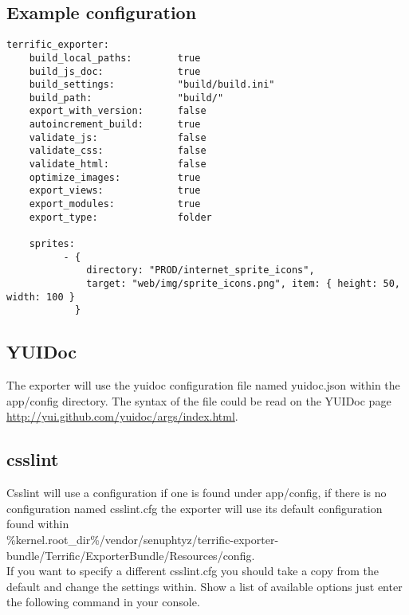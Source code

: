 

\newpage
\subsection{Example configuration}

\begin{verbatim}
terrific_exporter:
	build_local_paths:        true
	build_js_doc:             true
	build_settings:           "build/build.ini"
	build_path:               "build/"
	export_with_version:      false
	autoincrement_build:      true
	validate_js:              false
	validate_css:             false
	validate_html:            false
	optimize_images:          true
	export_views:             true
	export_modules:           true
	export_type:              folder

	sprites:
	      - {
	      	  directory: "PROD/internet_sprite_icons",
	      	  target: "web/img/sprite_icons.png", item: { height: 50, width: 100 }
	      	}

\end{verbatim}

\subsection{YUIDoc}
The exporter will use the yuidoc configuration file named yuidoc.json within the app/config directory. The syntax of the file could be read on the YUIDoc page \url{http://yui.github.com/yuidoc/args/index.html}.

\subsection{csslint}
Csslint will use a configuration if one is found under app/config, if there is no configuration named csslint.cfg the exporter will use its default configuration found within\\
\%kernel.root\_dir\%/vendor/senuphtyz/terrific-exporter-bundle/Terrific/ExporterBundle/Resources/config. \\

If you want to specify a different csslint.cfg you should take a copy from the default and change the settings within. Show a list of available options just enter the following command in your console.


